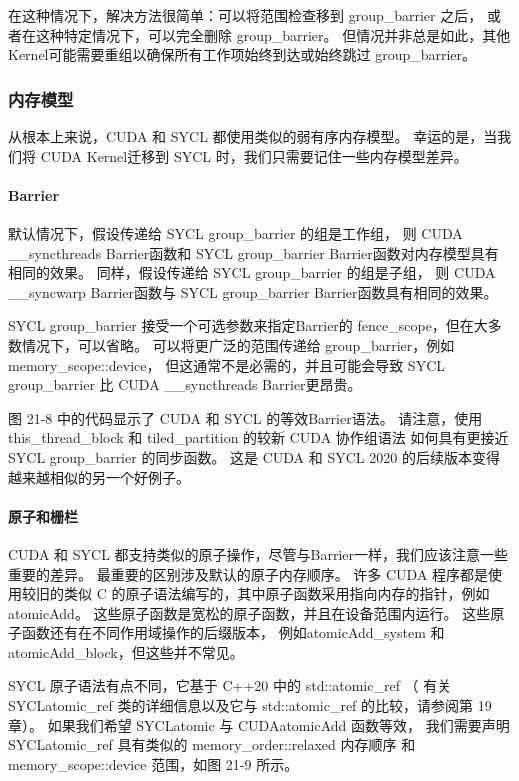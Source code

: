 在这种情况下，解决方法很简单：可以将范围检查移到 group\_barrier 之后，
或者在这种特定情况下，可以完全删除 group\_barrier。 
但情况并非总是如此，其他Kernel可能需要重组以确保所有工作项始终到达或始终跳过 group\_barrier。

\subsubsection{内存模型}
从根本上来说，CUDA 和 SYCL 都使用类似的弱有序内存模型。 
幸运的是，当我们将 CUDA Kernel迁移到 SYCL 时，我们只需要记住一些内存模型差异。

\paragraph{Barrier}

默认情况下，假设传递给 SYCL group\_barrier 的组是工作组，
则 CUDA \_\_syncthreads Barrier函数和 SYCL group\_barrier Barrier函数对内存模型具有相同的效果。 
同样，假设传递给 SYCL group\_barrier 的组是子组，
则 CUDA \_\_syncwarp Barrier函数与 SYCL group\_barrier Barrier函数具有相同的效果。

SYCL group\_barrier 接受一个可选参数来指定Barrier的 fence\_scope，但在大多数情况下，可以省略。 
可以将更广泛的范围传递给 group\_barrier，例如 memory\_scope::device，
但这通常不是必需的，并且可能会导致 SYCL group\_barrier 比 CUDA \_\_syncthreads Barrier更昂贵。

图 21-8 中的代码显示了 CUDA 和 SYCL 的等效Barrier语法。 
请注意，使用 this\_thread\_block 和 tiled\_partition 的较新 CUDA 协作组语法
如何具有更接近 SYCL group\_barrier 的同步函数。 
这是 CUDA 和 SYCL 2020 的后续版本变得越来越相似的另一个好例子。

\paragraph{原子和栅栏}

CUDA 和 SYCL 都支持类似的原子操作，尽管与Barrier一样，我们应该注意一些重要的差异。 
最重要的区别涉及默认的原子内存顺序。 
许多 CUDA 程序都是使用较旧的类似 C 的原子语法编写的，其中原子函数采用指向内存的指针，例如atomicAdd。 
这些原子函数是宽松的原子函数，并且在设备范围内运行。 
这些原子函数还有在不同作用域操作的后缀版本，
例如atomicAdd\_system 和atomicAdd\_block，但这些并不常见。

SYCL 原子语法有点不同，它基于 C++20 中的 std::atomic\_ref （
有关 SYCLatomic\_ref 类的详细信息以及它与 std::atomic\_ref 的比较，请参阅第 19 章）。 
如果我们希望 SYCLatomic 与 CUDAatomicAdd 函数等效，
我们需要声明 SYCLatomic\_ref 具有类似的 memory\_order::relaxed 内存顺序
和 memory\_scope::device 范围，如图 21-9 所示。

